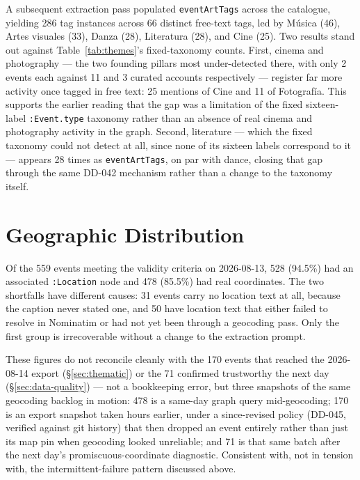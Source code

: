 \documentclass[12pt, a4paper]{report}
\begin{document}
A subsequent extraction pass populated \texttt{eventArtTags} across the
catalogue, yielding 286 tag instances across 66 distinct free-text tags,
led by Música (46), Artes visuales (33), Danza (28), Literatura (28), and
Cine (25). Two results stand out against Table~\ref{tab:themes}'s
fixed-taxonomy counts. First, cinema and photography — the two founding
pillars most under-detected there, with only 2 events each against 11
and 3 curated accounts respectively — register far more activity once
tagged in free text: 25 mentions of Cine and 11 of Fotografía. This
supports the earlier reading that the gap was a limitation of the fixed
sixteen-label \texttt{:Event.type} taxonomy rather than an absence of
real cinema and photography activity in the graph. Second, literature —
which the fixed taxonomy could not detect at all, since none of its
sixteen labels correspond to it — appears 28 times as
\texttt{eventArtTags}, on par with dance, closing that gap through the
same DD-042 mechanism rather than a change to the taxonomy itself.

\section{Geographic Distribution}
\label{sec:geographic}

Of the 559 events meeting the validity criteria on 2026-08-13, 528
(94.5\%) had an associated \texttt{:Location} node and 478 (85.5\%) had
real coordinates. The two shortfalls have different causes: 31 events
carry no location text at all, because the caption never stated one, and
50 have location text that either failed to resolve in Nominatim or had
not yet been through a geocoding pass. Only the first group is
irrecoverable without a change to the extraction prompt.

These figures do not reconcile cleanly with the 170 events that reached
the 2026-08-14 export (\S\ref{sec:thematic}) or the 71 confirmed
trustworthy the next day (\S\ref{sec:data-quality}) — not a bookkeeping
error, but three snapshots of the same geocoding backlog in motion: 478
is a same-day graph query mid-geocoding; 170 is an export snapshot taken
hours earlier, under a since-revised policy (DD-045, verified against
git history) that then dropped an event entirely rather than just its map
pin when geocoding looked unreliable; and 71 is that same batch after the
next day's promiscuous-coordinate diagnostic. Consistent with, not in
tension with, the intermittent-failure pattern discussed above.
\end{document}
